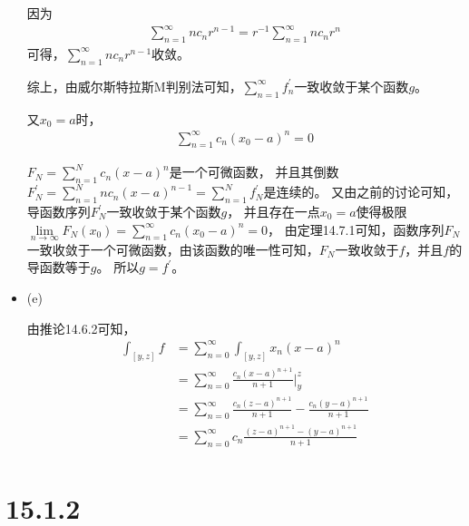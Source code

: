 \documentclass{article}
\begin{document}
\begin{itemize}
        因为
        \begin{align*}
          \sum\limits_{n = 1}^\infty nc_nr^{n - 1} = r^{-1} \sum\limits_{n = 1}^\infty nc_nr^{n}
        \end{align*}
        可得，$\sum\limits_{n = 1}^\infty nc_nr^{n - 1}$收敛。

        综上，由威尔斯特拉斯M判别法可知，$\sum \limits_{n = 1}^\infty f_n^\prime$一致收敛于某个函数$g$。

        又$x_0 = a$时，
        \begin{align*}
          \sum \limits_{n = 1}^\infty c_n(x_0 - a)^n = 0
        \end{align*}

        $F_N = \sum \limits_{n = 1}^N c_n(x - a)^n$是一个可微函数，
        并且其倒数$F_N^\prime = \sum \limits_{n = 1}^N nc_n(x - a)^{n - 1} = \sum \limits_{n = 1}^N f_N^\prime$是连续的。
        又由之前的讨论可知，导函数序列$F_N^\prime$一致收敛于某个函数$g$，
        并且存在一点$x_0 = a$使得极限$\lim\limits_{n \to \infty} F_N(x_0) = \sum \limits_{n = 1}^\infty c_n(x_0 - a)^n = 0$，
        由定理14.7.1可知，函数序列$F_N$一致收敛于一个可微函数，由该函数的唯一性可知，$F_N$一致收敛于$f$，并且$f$的导函数等于$g$。
        所以$g = f^\prime$。

  \item (e)

        由推论14.6.2可知，
        \begin{align*}
          \int_{[y, z]} f
           & = \sum\limits_{n = 0}^\infty \int_{[y, z]} x_n(x - a)^n                                          \\
           & = \sum\limits_{n = 0}^\infty \frac{c_n(x - a)^{n + 1}}{n + 1}|_y^z                               \\
           & = \sum\limits_{n = 0}^\infty \frac{c_n(z - a)^{n + 1}}{n + 1} - \frac{c_n(y - a)^{n + 1}}{n + 1} \\
           & = \sum\limits_{n = 0}^\infty c_n\frac{(z - a)^{n + 1} - (y - a)^{n + 1}}{n + 1}                  \\
        \end{align*}
\end{itemize}

\section*{15.1.2}
\end{document}
